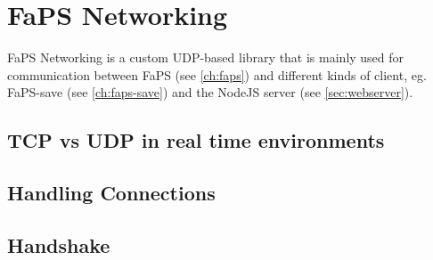 \chapter{FaPS Networking}
\label{ch:faps-networking}

\author{Nico Kratky}
%

FaPS Networking is a custom UDP-based library that is mainly used for communication between FaPS (see \ref{ch:faps}) and different kinds of client, eg. FaPS-save (see \ref{ch:faps-save}) and the NodeJS server (see
\ref{sec:webserver}).

\section{TCP vs UDP in real time environments}

%

\cite{TCPUDPRTlifesize}


\section {Handling Connections}





\section {Handshake}

